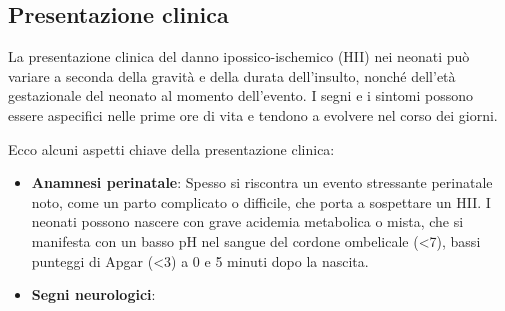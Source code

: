 \subsection{Presentazione clinica}

La presentazione clinica del danno ipossico-ischemico (HII) nei neonati può variare a seconda della gravità e della durata dell'insulto, nonché dell'età gestazionale del neonato al momento dell'evento. I segni e i sintomi possono essere aspecifici nelle prime ore di vita e tendono a evolvere nel corso dei giorni.

Ecco alcuni aspetti chiave della presentazione clinica:

\begin{itemize}
	\tightlist
	\item
	\textbf{Anamnesi perinatale}: Spesso si riscontra un evento stressante perinatale noto, come un parto complicato o difficile, che porta a sospettare un HII. I neonati possono nascere con grave acidemia metabolica o mista, che si manifesta con un basso pH nel sangue del cordone ombelicale (\textless7), bassi punteggi di Apgar (\textless3) a 0 e 5 minuti dopo la nascita.
	\item
	\textbf{Segni neurologici}:
	

\end{itemize}
